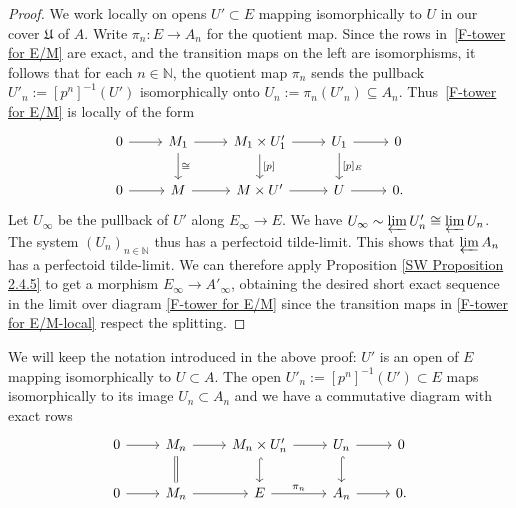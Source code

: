 \documentclass[10pt,oneside]{amsart}
\theoremstyle{definition}
\begin{document}
		\begin{proof}
			We work locally on opens $U'\subset E$ mapping isomorphically to $U$ in our cover $\mathfrak U$ of $A$. Write $\pi_n\colon E\to A_n$ for the quotient map. Since the rows in~\eqref{F-tower for E/M} are exact, and the transition maps on the left are isomorphisms, it follows that for each $n\in \mathbb{N}$, the quotient map $\pi_n$  sends the pullback $U'_n:=[p^n]^{-1}(U')$ isomorphically onto $U_n:=\pi_n(U'_n)\subseteq A_n$. Thus~\eqref{F-tower for E/M} is locally of the form
				\begin{equation}\label{F-tower for E/M-local}
				\begin{tikzcd}
				0 \arrow[r] & M_1\arrow[d, "\cong"] \arrow[r] &  M_1\times U_1' \arrow[d, "{[p]}"] \arrow[r] &U_1 \arrow[d, "{[p]_E}"] \arrow[r] & 0 \\
				0 \arrow[r] & M \arrow[r] & M\times U' \arrow[r] & U \arrow[r] & 0.
				\end{tikzcd}
				\end{equation}
			Let $U_\infty$ be the pullback of $U'$ along $E_\infty\to E$. We have $U_\infty\sim \varprojlim U'_n\cong \varprojlim U_n$. The system $(U_n)_{n\in \mathbb{N}}$ thus has a perfectoid tilde-limit. This shows that $\varprojlim A_n$ has a perfectoid tilde-limit. We can therefore apply Proposition \ref{SW Proposition 2.4.5} to get a morphism $E_\infty\rightarrow A'_\infty$, obtaining the desired short exact sequence in the limit over diagram \eqref{F-tower for E/M} since the transition maps in \eqref{F-tower for E/M-local} respect the splitting. 
		\end{proof}
	
We will keep the notation introduced in the above proof: $U'$ is an open of $E$ mapping isomorphically to $U\subset A$. The open $U'_n:=[p^n]^{-1}(U')\subset E$ maps isomorphically to its image $U_n\subset A_n$ and we have a commutative diagram with exact rows
\[
 		\begin{tikzcd}
		0 \arrow[r] & M_n \arrow[d, equal] \arrow[r] & M_n\times U'_n \arrow[d,hook] \arrow[r] &  U_n\arrow[d, hook] \arrow[r] & 0 \\
		0 \arrow[r] & M_n \arrow[r] & E \arrow[r,"{\pi_n}"] & A_n \arrow[r] & 0.
		\end{tikzcd}
\]
	
\end{document}
